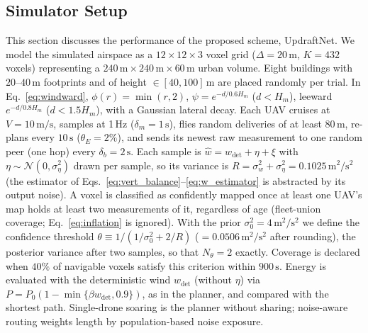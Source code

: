 \documentclass[conference]{IEEEtran}
\newcommand{\rd}[1]{#1}   %
\newcommand{\wdet}{w_{\mathrm{det}}}
\begin{document}
\subsection{Simulator Setup}
This section discusses the performance of the proposed
scheme, UpdraftNet. We model the simulated airspace as a
$12\!\times\!12\!\times\!3$ voxel grid ($\Delta=20\,\text{m}$, $K=432$ voxels) representing
a $240\,\text{m}\!\times\!240\,\text{m}\!\times\!60\,\text{m}$ urban volume. Eight buildings \rd{with $20$--$40\,\text{m}$ footprints and} of height
$\in[40,100]\,\text{m}$ are placed randomly per trial. \rd{In Eq.~\eqref{eq:windward}, $\phi(r)=\min(r,2)$, $\psi=e^{-d/0.6H_m}$ ($d<H_m$), leeward $e^{-d/0.8H_m}$ ($d<1.5H_m$), with a Gaussian lateral decay.} Each UAV cruises
at $V=10\,\text{m/s}$\rd{, samples at 1\,Hz ($\delta_m=1\,\text{s}$), flies random deliveries of at least $80\,\text{m}$, re-plans every $10\,\text{s}$ ($\theta_E=2\%$),} and \rd{sends its newest raw measurement to one random peer (one hop)} every $\delta_b=2\,\text{s}$.
\rd{Each sample is $\hat{w}=\wdet+\eta+\xi$ with $\eta\sim\mathcal{N}(0,\sigma_\eta^2)$ drawn per sample, so its variance is $R=\sigma_w^2+\sigma_\eta^2=0.1025\,\text{m}^2/\text{s}^2$ (the estimator of Eqs.~\eqref{eq:vert_balance}--\eqref{eq:w_estimator} is abstracted by its output noise).}
A voxel is
classified as confidently mapped \rd{once at least one UAV's map holds} at least two \rd{measurements of it, regardless of age (fleet-union coverage; Eq.~\eqref{eq:inflation} is ignored)}.
\rd{With the prior $\sigma_0^2=4\,\text{m}^2/\text{s}^2$ we define the confidence threshold $\theta\equiv1/(1/\sigma_0^2+2/R)$ ($=0.0506\,\text{m}^2/\text{s}^2$ after rounding), the posterior variance after two samples, so that $N_\theta=2$ exactly}. Coverage is declared when $40\%$ of \rd{navigable} voxels satisfy
this criterion\rd{ within $900\,\text{s}$}.
\rd{Energy is evaluated with the deterministic wind $\wdet$ (without $\eta$) via $P=P_0(1-\min\{\beta \wdet,0.9\})$, as in the planner, and compared with the shortest path. Single-drone soaring is the planner without sharing; noise-aware routing weights length by population-based noise exposure.}
\end{document}

